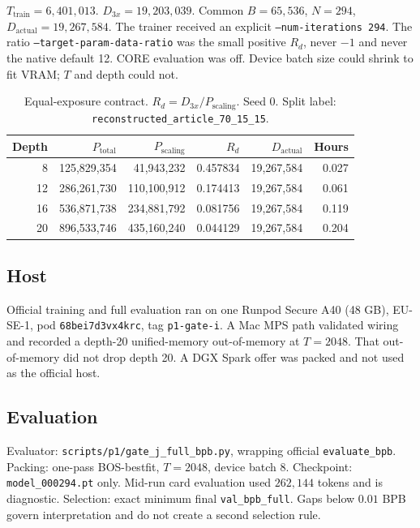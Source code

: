 \documentclass[11pt,a4paper]{article}
\begin{document}
$T_{\mathrm{train}}=6{,}401{,}013$. $D_{3x}=19{,}203{,}039$. Common $B=65{,}536$, $N=294$, $D_{\mathrm{actual}}=19{,}267{,}584$. The trainer received an explicit \texttt{--num-iterations 294}. The ratio \texttt{--target-param-data-ratio} was the small positive $R_d$, never $-1$ and never the native default 12. CORE evaluation was off. Device batch size could shrink to fit VRAM; $T$ and depth could not.

\begin{table}[t]
\centering
\caption{Equal-exposure contract. $R_d=D_{3x}/P_{\mathrm{scaling}}$. Seed 0. Split label: \texttt{reconstructed\_article\_70\_15\_15}.}
\label{tab:budget}
\begin{tabular}{rrrrrr}
\toprule
Depth & $P_{\mathrm{total}}$ & $P_{\mathrm{scaling}}$ & $R_d$ & $D_{\mathrm{actual}}$ & Hours \\
\midrule
8 & 125{,}829{,}354 & 41{,}943{,}232 & 0.457834 & 19{,}267{,}584 & 0.027 \\
12 & 286{,}261{,}730 & 110{,}100{,}912 & 0.174413 & 19{,}267{,}584 & 0.061 \\
16 & 536{,}871{,}738 & 234{,}881{,}792 & 0.081756 & 19{,}267{,}584 & 0.119 \\
20 & 896{,}533{,}746 & 435{,}160{,}240 & 0.044129 & 19{,}267{,}584 & 0.204 \\
\bottomrule
\end{tabular}
\end{table}

\subsection{Host}
Official training and full evaluation ran on one Runpod Secure A40 (48 GB), EU-SE-1, pod \texttt{68bei7d3vx4krc}, tag \texttt{p1-gate-i}. A Mac MPS path validated wiring and recorded a depth-20 unified-memory out-of-memory at $T=2048$. That out-of-memory did not drop depth 20. A DGX Spark offer was packed and not used as the official host.

\subsection{Evaluation}
Evaluator: \texttt{scripts/p1/gate\_j\_full\_bpb.py}, wrapping official \texttt{evaluate\_bpb}. Packing: one-pass BOS-bestfit, $T=2048$, device batch 8. Checkpoint: \texttt{model\_000294.pt} only. Mid-run card evaluation used $262{,}144$ tokens and is diagnostic. Selection: exact minimum final \texttt{val\_bpb\_full}. Gaps below $0.01$ BPB govern interpretation and do not create a second selection rule.
\end{document}
